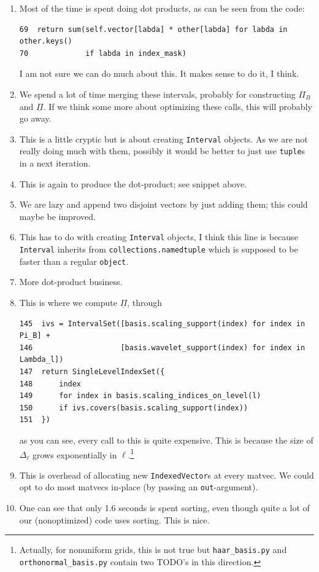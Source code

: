 \documentclass[11pt,a4paper]{amsart}
\theoremstyle{definition}
\begin{document}
\begin{enumerate}
  \item Most of the time is spent doing dot products, as can be seen from the code:
    \begin{verbatim}
69  return sum(self.vector[labda] * other[labda] for labda in other.keys()
70             if labda in index_mask)\end{verbatim}
    I am not sure we can do much about this. It makes sense to do it, I think.
  \item We spend a lot of time merging these intervals, probably for constructing
    $\Pi_B$ and $\underline \Pi$. If we think some more about optimizing these
    calls, this will probably go away.
  \item This is a little cryptic but is about creating \texttt{Interval} objects.
    As we are not really doing much with them, possibly it would be better to
    just use \texttt{tuple}s in a next iteration.
  \item This is again to produce the dot-product; see snippet above.
  \item We are lazy and append two disjoint vectors by just adding them; this
    could maybe be improved.
  \item This has to do with creating \texttt{Interval} objects, I think this line
    is because \texttt{Interval} inherits from \texttt{collections.namedtuple}
    which is supposed to be faster than a regular \texttt{object}.
  \item More dot-product business.
  \item This is where we compute $\underline \Pi$, through
    \begin{verbatim}
145  ivs = IntervalSet([basis.scaling_support(index) for index in Pi_B] +
146                    [basis.wavelet_support(index) for index in Lambda_l])
147  return SingleLevelIndexSet({
148      index
149      for index in basis.scaling_indices_on_level(l)
150      if ivs.covers(basis.scaling_support(index))
151  })\end{verbatim}
    as you can see, every call to this is quite expensive. This is because the
    size of $\Delta_\ell$ grows exponentially in $\ell$.\footnote{Actually, for
    nonuniform grids, this is not true but \texttt{haar\_basis.py} and
    \texttt{orthonormal\_basis.py} contain two TODO's in this direction.}
  \item This is overhead of allocating new \texttt{IndexedVector}s at every
    matvec. We could opt to do most matvecs in-place (by passing an
    \texttt{out}-argument).
  \item One can see that only 1.6 seconds is spent sorting, even though quite a
    lot of our (nonoptimized) code uses sorting. This is nice.
\end{enumerate}
\end{document}
